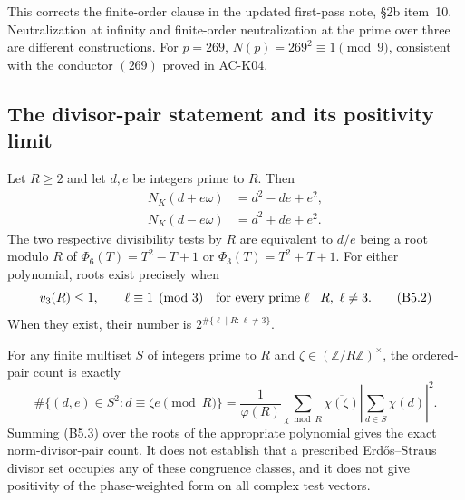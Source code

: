 This corrects the finite-order clause in the updated first-pass
note, \S2b item~10. Neutralization at infinity and finite-order
neutralization at the prime over three are different constructions.
For $p=269$, $N(p)=269^2\equiv1\pmod9$, consistent with
the conductor $(269)$ proved in AC-K04.

\subsection{The divisor-pair statement and its positivity limit}

\begin{proposition}
\label{AC-B05}
Let $R\ge2$ and let $d,e$ be integers prime to $R$. Then
\[
\begin{split}
 N_K(d+e\omega)&=d^2-de+e^2,\\
 N_K(d-e\omega)&=d^2+de+e^2.
\end{split}                                                  \tag{B5.1}
\]
The two respective divisibility tests by $R$ are equivalent
to $d/e$ being a root modulo $R$ of
$\Phi_6(T)=T^2-T+1$ or $\Phi_3(T)=T^2+T+1$.
For either polynomial, roots exist precisely when
\[
 v_3(R)\le1,\qquad
 \ell\equiv1\pmod3\quad\hbox{for every prime }\ell\mid R,
                                                 \ \ell\ne3. \tag{B5.2}
\]
When they exist, their number is
$2^{\#\{\ell\mid R:\ell\ne3\}}$.

For any finite multiset $S$ of integers prime to $R$ and
$\zeta\in(\mathbb Z/R\mathbb Z)^\times$, the ordered-pair
count is exactly
\[
 \#\{(d,e)\in S^2:d\equiv\zeta e\pmod R\}
 =\frac1{\varphi(R)}\sum_{\chi\bmod R}
          \overline{\chi(\zeta)}
          \left|\sum_{d\in S}\chi(d)\right|^2.              \tag{B5.3}
\]
Summing (B5.3) over the roots of the appropriate polynomial
gives the exact norm-divisor-pair count. It does not establish
that a prescribed Erd\H{o}s--Straus divisor set occupies any
of these congruence classes, and it does not give positivity
of the phase-weighted form on all complex test vectors.
\end{proposition}
